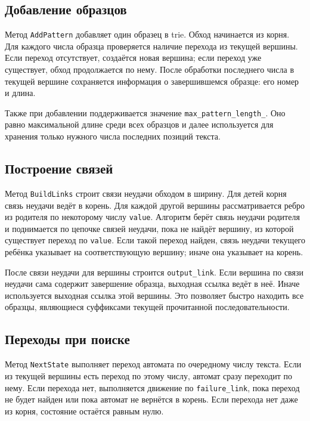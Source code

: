 \subsection{Добавление образцов}

Метод \texttt{AddPattern} добавляет один образец в trie. Обход начинается из корня. Для каждого числа
образца проверяется наличие перехода из текущей вершины. Если переход отсутствует, создаётся новая
вершина; если переход уже существует, обход продолжается по нему. После обработки последнего числа в
текущей вершине сохраняется информация о завершившемся образце: его номер и длина.

Также при добавлении поддерживается значение \texttt{max\_pattern\_length\_}. Оно равно максимальной
длине среди всех образцов и далее используется для хранения только нужного числа последних позиций текста.

\subsection{Построение связей}

Метод \texttt{BuildLinks} строит связи неудачи обходом в ширину. Для детей корня связь неудачи ведёт в
корень. Для каждой другой вершины рассматривается ребро из родителя по некоторому числу \texttt{value}.
Алгоритм берёт связь неудачи родителя и поднимается по цепочке связей неудачи, пока не найдёт вершину,
из которой существует переход по \texttt{value}. Если такой переход найден, связь неудачи текущего
ребёнка указывает на соответствующую вершину; иначе она указывает на корень.

После связи неудачи для вершины строится \texttt{output\_link}. Если вершина по связи неудачи сама
содержит завершение образца, выходная ссылка ведёт в неё. Иначе используется выходная ссылка этой
вершины. Это позволяет быстро находить все образцы, являющиеся суффиксами текущей прочитанной
последовательности.

\subsection{Переходы при поиске}

Метод \texttt{NextState} выполняет переход автомата по очередному числу текста. Если из текущей вершины
есть переход по этому числу, автомат сразу переходит по нему. Если перехода нет, выполняется движение по
\texttt{failure\_link}, пока переход не будет найден или пока автомат не вернётся в корень. Если перехода
нет даже из корня, состояние остаётся равным нулю.

